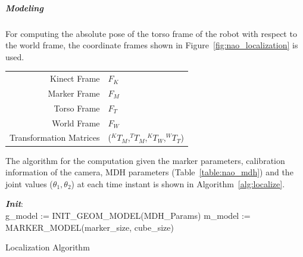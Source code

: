 \subparagraph{Modeling}
For computing the absolute pose of the torso frame of the robot with respect to the world frame, the coordinate frames shown in Figure~\ref{fig:nao_localization} is used. 

\begin{tabular}{r l}
\centering
  Kinect Frame & $F_K$ \\ 
  Marker Frame & $F_M$ \\ 
  Torso Frame & $F_T$ \\ 
  World Frame & $F_W$ \\ 
  Transformation Matrices  & ($^{K}T_M$,$^{T}T_M$,$^{K}T_W$,$^{W}T_T$) \\
\end{tabular}

The algorithm for the computation given the marker parameters, calibration information of the camera, MDH parameters (Table~\ref{table:nao_mdh}) and the joint values ($\theta_1,\theta_2$) at each time instant is shown in Algorithm~\ref{alg:localize}.

\begin{algorithm}
 \textbf{\emph{Init}}:\\
 g\_model := INIT\_GEOM\_MODEL(MDH\_Params)\;
 m\_model := MARKER\_MODEL(marker\_size, cube\_size)\;
 \caption{Localization Algorithm}
 \label{alg:localize}
\end{algorithm}

